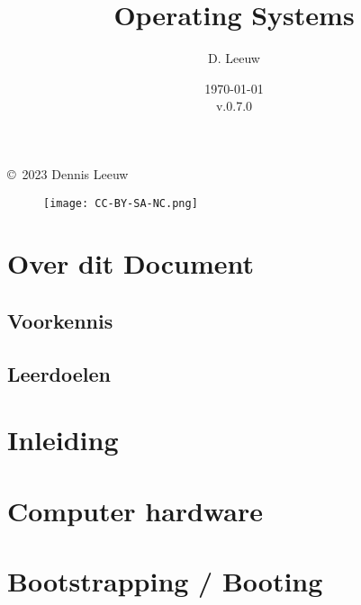 \documentclass[a4paper,12pt,twoside,openright,titlepage]{book}
\author{D. Leeuw}
\title{Operating Systems}
\date{\today\\v.0.7.0}
\begin{document}

\maketitle

\copyright\ 2023 Dennis Leeuw\\

\begin{figure}
\texttt{[image: CC-BY-SA-NC.png]}
\end{figure}

\bigskip




\frontmatter
\chapter{Over dit Document}
\section{Voorkennis}

\section{Leerdoelen}


\tableofcontents


\mainmatter
\chapter{Inleiding}


\chapter{Computer hardware}


\chapter{Bootstrapping / Booting}

\end{document}
